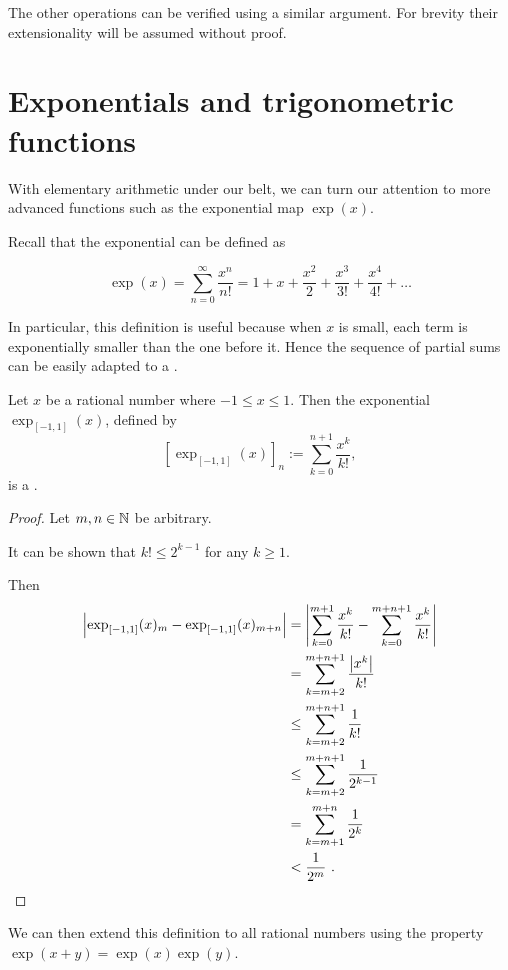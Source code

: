 \documentclass[leqno]{report}
\begin{document}
The other operations can be verified using a similar argument. For brevity their extensionality will be assumed without proof.

\section{Exponentials and trigonometric functions}

With elementary arithmetic under our belt, we can turn our attention to more advanced functions such as the exponential map $\exp(x)$.

Recall that the exponential can be defined as

\[
    \exp(x) = \sum_{n=0}^\infty \frac{x^n}{n!}
    = 1 + x + \frac{x^2}{2} + \frac{x^3}{3!} + \frac{x^4}{4!} + \ldots
\]

In particular, this definition is useful because when $x$ is small, each term is exponentially smaller than the one before it. Hence the sequence of partial sums can be easily adapted to a \FCCS.

\begin{Proposition}
    Let $x$ be a rational number where $-1 \leq x \leq 1$. Then the exponential $\exp_{[-1,1]}(x)$, defined by
    \[
        \left[\exp_{[-1,1]}(x)\right]_n := \sum_{k=0}^{n+1} \frac{x^k}{k!},
    \]
    is a \FCCS.
\end{Proposition}

\begin{proof}
    Let $m, n \in \mathbb{N}$ be arbitrary.

    It can be shown that $k! \leq 2^{k-1}$ for any $k \geq 1$.

    Then
    \begin{align*}
        \left| \exp_{[-1,1]}(x)_m - \exp_{[-1,1]}(x)_{m+n} \right|
        &= \left| \sum_{k=0}^{m+1} \frac{x^k}{k!} - \sum_{k=0}^{m+n+1} \frac{x^k}{k!} \right| \\
        &= \sum_{k=m+2}^{m+n+1} \frac{\left| x^k \right|}{k!} \\
        &\leq \sum_{k=m+2}^{m+n+1} \frac{1}{k!} \\
        &\leq \sum_{k=m+2}^{m+n+1} \frac{1}{2^{k-1}} \\
        &= \sum_{k=m+1}^{m+n} \frac{1}{2^k} \\
        &< \frac{1}{2^m} \ . \qedhere
    \end{align*}
\end{proof}

We can then extend this definition to all rational numbers using the property $\exp(x + y) = \exp(x)\exp(y)$.
\end{document}
